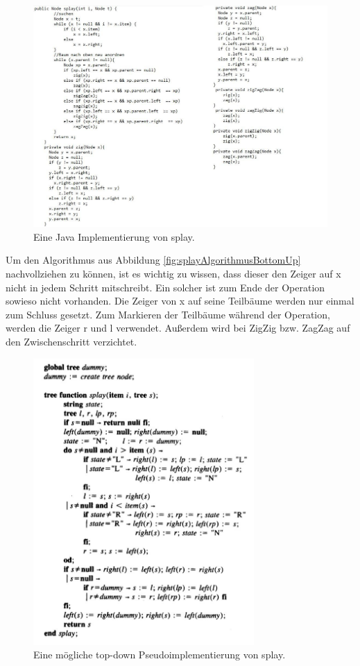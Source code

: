 \documentclass[11pt, a4paper]{article}
\begin{document}
	\begin{figure}[H]
	\centering
	\includegraphics[width=1.2\textwidth]{"bilder/splayJava"}
	\caption{Eine Java Implementierung von splay. }
	\label{fig:splayJava}
	\end{figure}
	\noindent Um den Algorithmus aus Abbildung  \ref{fig:splayAlgorithmusBottomUp} nachvollziehen zu können, ist es wichtig zu wissen, dass dieser den Zeiger auf x nicht in jedem Schritt mitschreibt. Ein solcher ist zum Ende der Operation sowieso nicht vorhanden. Die Zeiger von x auf seine Teilbäume werden nur einmal zum Schluss gesetzt. Zum Markieren der Teilbäume während der Operation, werden die Zeiger r und l verwendet. Außerdem wird bei ZigZig bzw. ZagZag auf den Zwischenschritt verzichtet.
	
  	 
	\begin{figure}[H]
	\centering
	\includegraphics[width=0.75\textwidth]{"bilder/splayAlgorithmusTopDown"}
	\caption{Eine mögliche top-down Pseudoimplementierung von splay.\cite{sl1} }
	\label{fig:splayAlgorithmusTopDown}
	\end{figure}
	
\end{document}
